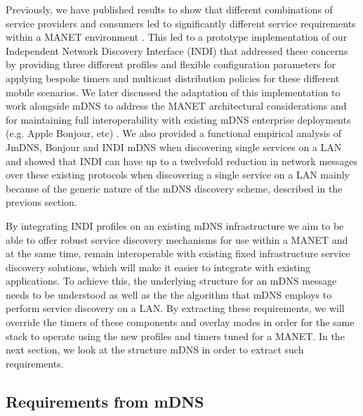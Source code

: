 Previously, we have published results to show that different combinations of service providers and consumers led to significantly different service requirements within a MANET environment \cite{Macker2010}. This led to a prototype implementation of our Independent Network Discovery Interface (INDI) that addressed these concerns by providing three different profiles and flexible configuration parameters for applying bespoke timers and multicast distribution policies for these different mobile scenarios. We later discussed the adaptation of this implementation to work alongside mDNS to address the MANET architectural considerations and for maintaining full interoperability with existing mDNS enterprise deployments (e.g. Apple Bonjour, etc) \cite{Macker2011}. We also provided a functional empirical analysis of JmDNS, Bonjour and INDI mDNS when discovering single services on a LAN and showed that  INDI can have up to a twelvefold reduction in network messages over these existing protocols when discovering a single service on a LAN mainly because of the generic nature of the mDNS discovery scheme, described in the previous section.

By integrating INDI profiles on an existing mDNS infrastructure we aim to be able to offer robust service discovery mechanisms for use within a MANET and at the same time, remain interoperable with existing fixed infrastructure service discovery solutions, which will make it easier to integrate with existing applications. To achieve this, the underlying structure for an mDNS message needs to be understood as well as the the algorithm that mDNS employs to perform service discovery on a LAN.  By extracting these requirements, we will override the timers of these components and overlay modes in order for the same stack to operate using the new profiles and timers tuned for a MANET.  In the next section, we look at the structure mDNS in order to extract such requirements.

\subsection{Requirements from mDNS}
\label{sec:requirements}

